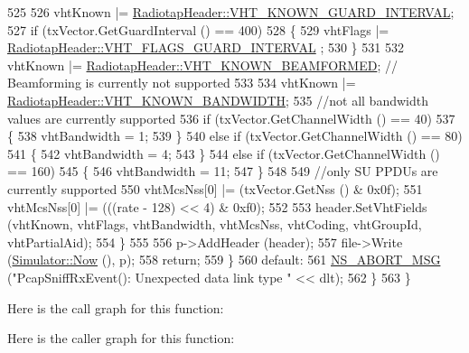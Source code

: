 \begin{DoxyCode}
525 
526             vhtKnown |= \hyperlink{classns3_1_1RadiotapHeader_a3479bfa57eb27bd6e5eeb2556ab8f5a8a7fc9564ea0ad14f0f62001929f06d3e8}{RadiotapHeader::VHT\_KNOWN\_GUARD\_INTERVAL};
527             \textcolor{keywordflow}{if} (txVector.GetGuardInterval () == 400)
528               \{
529                 vhtFlags |= \hyperlink{classns3_1_1RadiotapHeader_a6df30f9a6b9d20263a6e5531377eed5caf6d5b32fb7e1c0b442c7d4b6c8dc944e}{RadiotapHeader::VHT\_FLAGS\_GUARD\_INTERVAL}
      ;
530               \}
531 
532             vhtKnown |= \hyperlink{classns3_1_1RadiotapHeader_a3479bfa57eb27bd6e5eeb2556ab8f5a8aee35ae1d0986b232b16c5085a351df43}{RadiotapHeader::VHT\_KNOWN\_BEAMFORMED}; \textcolor{comment}{//
      Beamforming is currently not supported}
533 
534             vhtKnown |= \hyperlink{classns3_1_1RadiotapHeader_a3479bfa57eb27bd6e5eeb2556ab8f5a8a740d1500b4e9c1df563f01392a4b7945}{RadiotapHeader::VHT\_KNOWN\_BANDWIDTH};
535             \textcolor{comment}{//not all bandwidth values are currently supported}
536             \textcolor{keywordflow}{if} (txVector.GetChannelWidth () == 40)
537               \{
538                 vhtBandwidth = 1;
539               \}
540             \textcolor{keywordflow}{else} \textcolor{keywordflow}{if} (txVector.GetChannelWidth () == 80)
541               \{
542                 vhtBandwidth = 4;
543               \}
544             \textcolor{keywordflow}{else} \textcolor{keywordflow}{if} (txVector.GetChannelWidth () == 160)
545               \{
546                 vhtBandwidth = 11;
547               \}
548 
549             \textcolor{comment}{//only SU PPDUs are currently supported}
550             vhtMcsNss[0] |= (txVector.GetNss () & 0x0f);
551             vhtMcsNss[0] |= (((rate - 128) << 4) & 0xf0);
552 
553             header.SetVhtFields (vhtKnown, vhtFlags, vhtBandwidth, vhtMcsNss, vhtCoding, vhtGroupId, 
      vhtPartialAid);
554           \}
555 
556         p->AddHeader (header);
557         file->Write (\hyperlink{classns3_1_1Simulator_ac3178fa975b419f7875e7105be122800}{Simulator::Now} (), p);
558         \textcolor{keywordflow}{return};
559       \}
560     \textcolor{keywordflow}{default}:
561       \hyperlink{group__fatal_ga51ac4699be799d772ae7258d1ef6af21}{NS\_ABORT\_MSG} (\textcolor{stringliteral}{"PcapSniffRxEvent(): Unexpected data link type "} << dlt);
562     \}
563 \}
\end{DoxyCode}


Here is the call graph for this function\+:




Here is the caller graph for this function\+:


